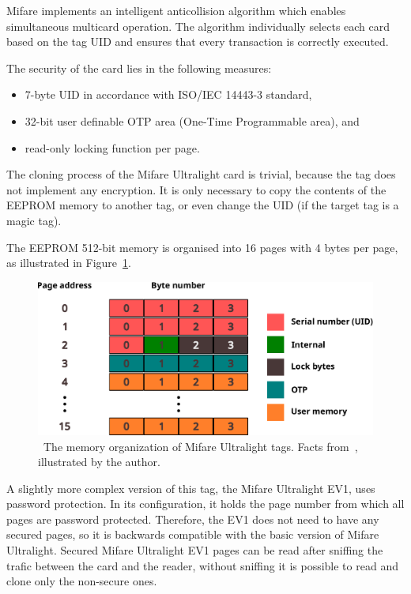 Mifare implements an intelligent anticollision algorithm which enables simultaneous multicard operation. The algorithm individually selects each card based on the tag UID and ensures that every transaction is correctly executed.~\cite{ultralightdatasheet}

The security of the card lies in the following measures:

\begin{itemize}
    \item  7-byte UID in accordance with ISO/IEC 14443-3 standard,
    \item 32-bit user definable OTP area (One-Time Programmable area), and
    \item read-only locking function per page.
\end{itemize}
The cloning process of the Mifare Ultralight card is trivial, because the tag does not implement any encryption. It is only necessary to copy the contents of the EEPROM memory to another tag, or even change the UID (if the target tag is a magic tag).~\cite{ultralightdatasheet, preucil2023surveying}

The EEPROM 512-bit memory is organised into 16 pages with 4 bytes per page, as illustrated in Figure~\ref{fig:ultralightmemory}.~\cite{ultralightdatasheet}

\begin{figure}[ht]
  \centering
  \includegraphics[width=12cm]{text/theoretical_background/ultralight_data.pdf}
  \caption[The memory organization of Mifare Ultralight tags.]{~The memory organization of Mifare Ultralight tags. Facts from~\cite{ultralightdatasheet}, illustrated by the author.}
  \label{fig:ultralightmemory}
\end{figure}

A slightly more complex version of this tag, the Mifare Ultralight EV1, uses password protection. In its configuration, it holds the page number from which all pages are password protected. Therefore, the EV1 does not need to have any secured pages, so it is backwards compatible with the basic version of Mifare Ultralight. Secured Mifare Ultralight EV1 pages can be read after sniffing the trafic between the card and the reader, without sniffing it is possible to read and clone only the non-secure ones.~\cite{ultralightev1datasheet, preucil2023surveying}

